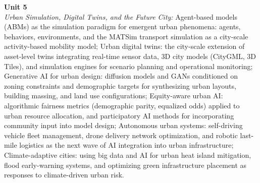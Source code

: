 \noindent\textbf{Unit 5} \\
\textit{Urban Simulation, Digital Twins, and the Future City:} Agent-based models (ABMs) as the simulation paradigm for emergent urban phenomena: agents, behaviors, environments, and the MATSim transport simulation as a city-scale activity-based mobility model; Urban digital twins: the city-scale extension of asset-level twins integrating real-time sensor data, 3D city models (CityGML, 3D Tiles), and simulation engines for scenario planning and operational monitoring; Generative AI for urban design: diffusion models and GANs conditioned on zoning constraints and demographic targets for synthesizing urban layouts, building massing, and land use configurations; Equity-aware urban AI: algorithmic fairness metrics (demographic parity, equalized odds) applied to urban resource allocation, and participatory AI methods for incorporating community input into model design; Autonomous urban systems: self-driving vehicle fleet management, drone delivery network optimization, and robotic last-mile logistics as the next wave of AI integration into urban infrastructure; Climate-adaptive cities: using big data and AI for urban heat island mitigation, flood early-warning systems, and optimizing green infrastructure placement as responses to climate-driven urban risk.

\newpage
{}
